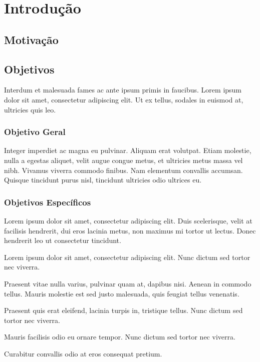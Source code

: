 \chapter{Introdução}
\label{cap:introducao}

\section{Motivação}
\label{sec:motivacao}

\lipsum[3]
\lipsum[4]

\section{Objetivos}
\label{sec:objetivos}



Interdum et malesuada fames ac ante ipsum primis in faucibus. Lorem ipsum dolor sit amet, consectetur adipiscing elit. Ut ex tellus, sodales in euismod at, ultricies quis leo.

\subsection{Objetivo Geral}
\label{sec:objetivo-geral}

Integer imperdiet ac magna eu pulvinar. Aliquam erat volutpat. Etiam molestie, nulla a egestas aliquet, velit augue congue metus, et ultricies metus massa vel nibh. Vivamus viverra commodo finibus. Nam elementum convallis accumsan. Quisque tincidunt purus nisl, tincidunt ultricies odio ultrices eu.

\subsection{Objetivos Específicos}
\label{sec:objetivos-especificos}

Lorem ipsum dolor sit amet, consectetur adipiscing elit. Duis scelerisque, velit at facilisis hendrerit, dui eros lacinia metus, non maximus mi tortor ut lectus. Donec hendrerit leo ut consectetur tincidunt. 

	\begin{alineas}
		\item Lorem ipsum dolor sit amet, consectetur adipiscing elit. Nunc dictum sed tortor nec viverra.
		\item Praesent vitae nulla varius, pulvinar quam at, dapibus nisi. Aenean in commodo tellus. Mauris molestie est sed justo malesuada, quis feugiat tellus venenatis.
		\item Praesent quis erat eleifend, lacinia turpis in, tristique tellus. Nunc dictum sed tortor nec viverra.
		\item Mauris facilisis odio eu ornare tempor. Nunc dictum sed tortor nec viverra.
		\item Curabitur convallis odio at eros consequat pretium.
	\end{alineas}